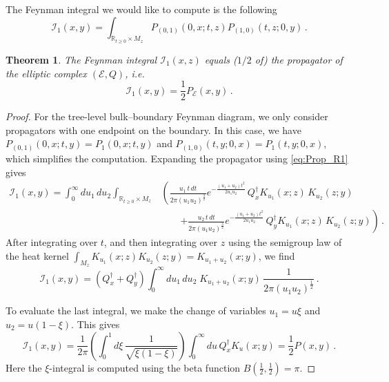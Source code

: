 \documentclass[11pt]{article}
\newcommand{\R}{\mathbb{R}}
\numberwithin{equation}{section}
\newtheorem{theorem}{Theorem}[section]
\begin{document}
The Feynman integral we would like to compute is the following
\begin{equation}
	\mathcal{I}_1(x,y) = \int_{\R_{t\geq 0}\times M_z}P_{(0,1)}(0,x;t,z)P_{(1,0)}(t,z;0,y)\,.
\end{equation}
\begin{theorem}\label{thm:uni_bdy}
	The Feynman integral $\mathcal{I}_1(x,z)$ equals ($1/2$ of) the propagator of the elliptic complex $(\mathcal{E},Q)$, i.e.
	\begin{equation}
		\mathcal{I}_1(x,y) = \frac{1}{2}P_{\mathcal{E}}(x,y)\,.
	\end{equation}
\end{theorem}
\begin{proof}
For the tree-level bulk--boundary Feynman diagram, we only consider propagators with one endpoint on the boundary. In this case, we have $P_{(0,1)}(0,x;t,y)=P_1(0,x;t,y)$ and $P_{(1,0)}(t,y;0,x)=P_1(t,y;0,x)$, which simplifies the computation. Expanding the propagator using \eqref{eq:Prop_R1} gives
\begin{equation}
\begin{aligned}
	\mathcal{I}_1(x,y) = \int_0^\infty du_1\,du_2 \int_{\R_{t\geq 0}\times M_z} &\left( \frac{u_1\,t\,dt}{2\pi (u_1u_2)^{\frac{3}{2}}} e^{-\frac{(u_1+u_2)t^2}{2u_1u_2}}\,Q_x^{\dagger}K_{u_1}(x;z)\,K_{u_2}(z;y)\right.\\
	&\qquad\left. + \frac{u_2\,t\,dt}{2\pi (u_1u_2)^{\frac{3}{2}}} e^{-\frac{(u_1+u_2)t^2}{2u_1u_2}}\, Q_y^{\dagger}K_{u_1}(x;z)\,K_{u_2}(z;y) \right)\,.
\end{aligned}
\end{equation}
After integrating over $t$, and then integrating over $z$ using the semigroup law of the heat kernel $\int_{M_z} K_{u_1}(x;z)K_{u_2}(z;y)=K_{u_1+u_2}(x;y)$, we find
\begin{equation}\label{eq:uni_bdy_Kint1}
	\mathcal{I}_1(x,y) = (Q_x^{\dagger}+Q_y^{\dagger})\int_0^\infty du_1\,du_2\;K_{u_1+u_2}(x;y)\,\frac{1}{2\pi (u_1u_2)^{\frac{1}{2}}}\,.
\end{equation}

To evaluate the last integral, we make the change of variables $u_1=u\xi$ and $u_2=u(1-\xi)$. This gives
\begin{equation}\label{eq:uni_bdy_Kint2}
	\mathcal{I}_1(x,y)= \frac{1}{2\pi}\left(\int_0^1 d\xi\,\frac{1}{\sqrt{\xi(1-\xi)}}\right)
	\int_0^\infty du\, Q_x^{\dagger}K_u(x;y)= \frac{1}{2}P(x,y)\,.
\end{equation}
Here the $\xi$-integral is computed using the beta function $B(\frac{1}{2},\frac{1}{2})=\pi$.

\end{proof}
\end{document}
